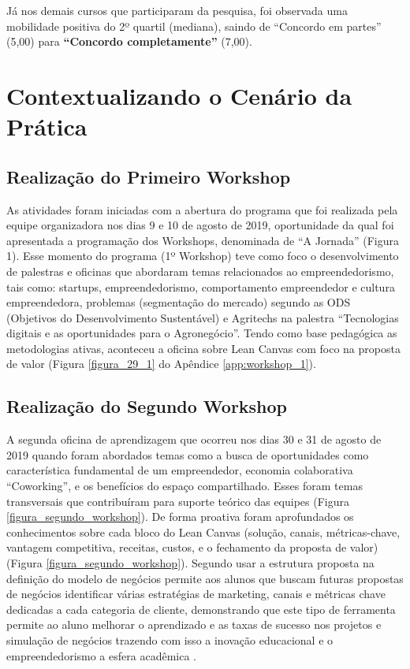 Já nos demais cursos que participaram da pesquisa, foi observada uma mobilidade positiva do 2º quartil (mediana), saindo de “Concordo em partes” (5,00) para \textbf{“Concordo completamente”} (7,00).


\section{Contextualizando o Cenário da Prática}

\subsection{Realização do Primeiro Workshop}

As atividades foram iniciadas com a abertura do programa que foi realizada pela equipe organizadora nos dias 9 e 10 de agosto de 2019, oportunidade da qual foi apresentada a programação dos Workshops, denominada de “A Jornada” (Figura 1). Esse momento do programa (1º Workshop) teve como foco o desenvolvimento de palestras e oficinas que abordaram temas relacionados ao empreendedorismo, tais como: startups, empreendedorismo, comportamento empreendedor e cultura empreendedora, problemas (segmentação do mercado) segundo as ODS (Objetivos do Desenvolvimento Sustentável) e Agritechs na palestra “Tecnologias digitais e as oportunidades para o Agronegócio”. Tendo como base pedagógica as metodologias ativas, aconteceu a oficina sobre Lean Canvas com foco na proposta de valor (Figura \ref{figura_29_1} do Apêndice 
\ref{app:workshop_1}).

\subsection{Realização do Segundo Workshop}

A segunda oficina de aprendizagem que ocorreu nos dias 30 e 31 de agosto de 2019 quando foram abordados temas como a busca de oportunidades como característica fundamental de um empreendedor, economia colaborativa “Coworking”, e os benefícios do espaço compartilhado. Esses foram temas transversais que contribuíram para suporte teórico das equipes (Figura \ref{figura_segundo_workshop}). De forma proativa foram aprofundados os conhecimentos sobre cada bloco do Lean Canvas (solução, canais, métricas-chave, vantagem competitiva, receitas, custos, e o fechamento da proposta de valor) (Figura \ref{figura_segundo_workshop}). Segundo  usar a estrutura proposta na definição do modelo de negócios permite aos alunos que buscam futuras propostas de negócios identificar várias estratégias de marketing, canais e métricas chave dedicadas a cada categoria de cliente, demonstrando que este tipo de ferramenta permite ao aluno melhorar o aprendizado e as taxas de sucesso nos projetos e simulação de negócios trazendo com isso a inovação educacional e o empreendedorismo a esfera acadêmica \cite{kukreti_entrepreneurship_2019}.

